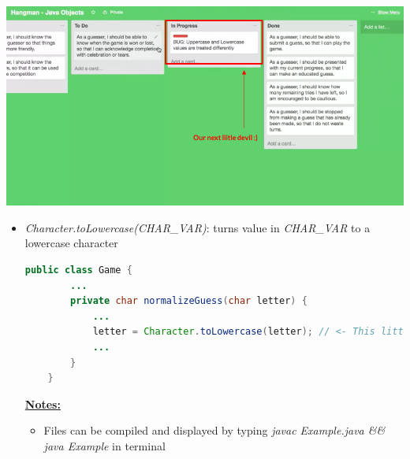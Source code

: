 \documentclass[12pt]{article}
\begin{document}
\begin{center}
\includegraphics[width=\linewidth]{images/part_4_notes_2.png}
\end{center}

\begin{itemize}
    \item \textit{Character.toLowercase(CHAR\_VAR)}: turns value in \textit{CHAR\_VAR}
    to a lowercase character


    \begin{lstlisting}[language=Java,caption={lesson\_02/Game.java}]
    public class Game {
        ...
        private char normalizeGuess(char letter) {
            ...
            letter = Character.toLowercase(letter); // <- This little guy here :)
            ...
        }
    }
    \end{lstlisting}

    \bigskip

    \underline{\textbf{Notes:}}

    \bigskip

    \begin{itemize}
        \item Files can be compiled and displayed by typing \textit{javac Example.java \&\& java Example}
        in terminal
    \end{itemize}
\end{itemize}
\end{document}
